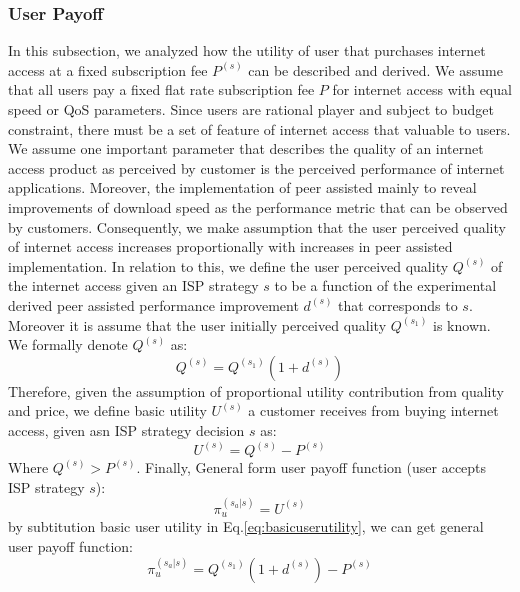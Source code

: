 \documentclass[paper]{ieice}
\begin{document}
\subsubsection{User Payoff}
In this subsection, we  analyzed how the utility of user that purchases internet access at a fixed subscription fee $P^{(s)}$ can be described and derived. 
We assume that all users pay a fixed flat rate subscription fee $P$ for internet access with equal speed or QoS parameters.
Since users are rational player and subject to budget constraint, there must be a set of feature of internet access that valuable to users.
We assume one important parameter that describes the quality of an internet access product as perceived by customer is the perceived performance of internet applications.  
Moreover, the implementation of peer assisted mainly to reveal improvements of download speed as the performance metric that can be observed by customers.
Consequently, we make assumption that the user perceived quality of internet access increases proportionally with increases in peer assisted implementation. 
In relation to this, we define the user perceived quality $Q^{(s)}$ of the internet access given an ISP strategy $s$ to be a function of the experimental derived peer assisted performance improvement $d^{(s)}$ that corresponds to $s$. 
Moreover it is assume that the user initially perceived quality $Q^{(s_1)}$ is known. 
We formally denote $Q^{(s)}$ as:
\begin{equation}\label{eq:basicuserutility}
	Q^{(s)} = Q^{(s_1)} (1 + d^{(s)})
\end{equation}
Therefore, given the assumption of proportional utility contribution from quality and price, we define basic utility $U^{(s)}$ a customer receives from buying internet access, given asn ISP strategy decision $s$ as:
\begin{equation}
	U^{(s)} = Q^{(s)} - P^{(s)}
\end{equation}
Where $Q^{(s)} > P^{(s)}$.
Finally, General form user payoff function (user accepts ISP strategy $s$):
\begin{equation}
	\pi^{(s_a | s)}_u = U^{(s)}
\end{equation}
by subtitution basic user utility in Eq.\ref{eq:basicuserutility}, we can get general user payoff function:
\begin{equation}
	\pi^{(s_a | s)}_u  = Q^{(s_1)} ( 1 + d^{(s)}) - P^{(s)}	
\end{equation}


\end{document}
